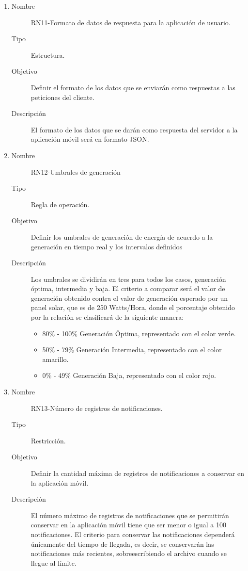 \begin{enumerate}[label=RN\arabic*.]
\item \label{RN11}
		\begin{description}
			\item[Nombre] RN11-Formato de datos de respuesta para la aplicación de usuario.
			\item[Tipo] Estructura.
			\item[Objetivo] Definir el formato de los datos que se enviarán como respuestas a las peticiones del cliente.
			\item[Descripción] El formato de los datos que se darán como respuesta del servidor a la aplicación móvil será en formato JSON.
			\end{description}
		
\item \label{RN12}
		\begin{description}
			\item[Nombre] RN12-Umbrales de generación
			\item[Tipo] Regla de operación.
			\item[Objetivo] Definir los umbrales de generación de energía de acuerdo a la generación en tiempo real y los intervalos definidos 
			\item[Descripción] Los umbrales se dividirán  en tres para todos los casos, generación óptima, intermedia y baja.
			El criterio a comparar será el valor de generación obtenido contra el valor de generación esperado por un panel solar, que es de 250 Watts/Hora, donde el porcentaje obtenido por la relación se clasificará de la siguiente manera:
			\begin{itemize}
			    \item 80\% - 100\% Generación Óptima, representado con el color verde.
			    \item 50\% - 79\% Generación Intermedia, representado con el color amarillo.
			    \item 0\% - 49\% Generación Baja, representado con el color rojo.
			\end{itemize}
		\end{description}
	
\item \label{RN13}
		\begin{description}
			\item[Nombre] RN13-Número de registros de notificaciones.
			\item[Tipo] Restricción.
			\item[Objetivo] Definir la cantidad máxima de registros de notificaciones a conservar en la aplicación móvil.
			\item[Descripción] El número máximo de registros de notificaciones que se permitirán conservar en la aplicación móvil tiene que ser menor o igual a 100 notificaciones. El criterio para conservar las notificaciones dependerá únicamente del tiempo de llegada, es decir, se conservarán las notificaciones más recientes, sobreescribiendo el archivo cuando se llegue al límite.   
		\end{description}
		

\end{enumerate}
